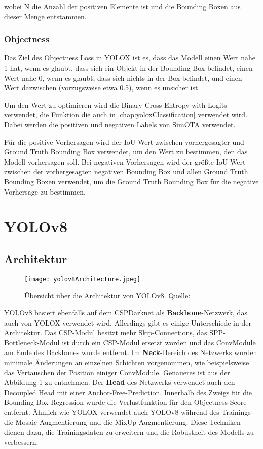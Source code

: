 wobei N die Anzahl der positiven Elemente ist und die Bounding Boxen aus dieser Menge entstammen. \cite{yoloxExplanationHowWorks}

\subsubsection{Objectness}
Das Ziel des Objectness Loss in YOLOX ist es, dass das Modell einen Wert nahe 1 hat, wenn es glaubt, dass sich ein Objekt in der Bounding Box befindet, einen Wert nahe 0, wenn es glaubt, dass sich nichts in der Box befindet, und einen Wert dazwischen (vorzugsweise etwa 0.5), wenn es unsicher ist.

Um den Wert zu optimieren wird die Binary Cross Entropy with Logits verwendet, die Funktion die auch in \ref{chap:yoloxClassification} verwendet wird. Dabei werden die positiven und negativen Labels von SimOTA verwendet.

Für die positive Vorhersagen wird der IoU-Wert zwischen vorhergesagter und Ground Truth Bounding Box verwendet, um den Wert zu bestimmen, den das Modell vorhersagen soll. Bei negativen Vorhersagen wird der größte IoU-Wert zwischen der vorhergesagten negativen Bounding Box und allen Ground Truth Bounding Boxen verwendet, um die Ground Truth Bounding Box für die negative Vorhersage zu bestimmen. \cite{yoloxExplanationHowWorks}


\section{YOLOv8}\label{chap:yolov8}
\subsection{Architektur}
\begin{figure}[h]
	\centering
	\texttt{[image: yolov8Architecture.jpeg]}
	\caption[Übersicht über die Architektur von YOLOv8]{Übersicht über die Architektur von YOLOv8. Quelle: \cite{yoloArchitecture}}
	\label{fig:yolov8Architecture}
\end{figure}

YOLOv8 basiert ebenfalls auf dem CSPDarknet als \textbf{Backbone}-Netzwerk, das auch von YOLOX verwendet wird. Allerdings gibt es einige Unterschiede in der Architektur. Das CSP-Modul besitzt mehr Skip-Connections, das SPP-Bottleneck-Modul ist durch ein CSP-Modul ersetzt worden und das ConvModule am Ende des Backbones wurde entfernt. Im \textbf{Neck}-Bereich des Netzwerks wurden minimale Änderungen an einzelnen Schichten vorgenommen, wie beispielsweise das Vertauschen der Position einiger ConvModule. Genaueres ist aus der Abbildung \ref{fig:yolov8Architecture} zu entnehmen.
Der \textbf{Head} des Netzwerks verwendet auch den Decoupled Head mit einer Anchor-Free-Prediction. Innerhalb des Zweigs für die Bounding Box Regression wurde die Verlustfunktion für den Objectness Score entfernt. Ähnlich wie YOLOX verwendet auch YOLOv8 während des Trainings die Mosaic-Augmentierung und die MixUp-Augmentierung. Diese Techniken dienen dazu, die Trainingsdaten zu erweitern und die Robustheit des Modells zu verbessern. \cite{yolov8ModelExplanation}

